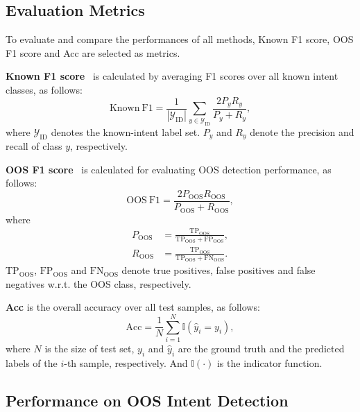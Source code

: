 \documentclass[11pt]{article}
\begin{document}
\subsection{Evaluation Metrics}

To evaluate and compare the performances of all methods, Known F1 score, OOS F1 score and Acc are selected as metrics. 

\textbf{Known F1 score}~\citep{wang2021texsmart, zawbaa2024improved} is calculated by averaging F1 scores over all known intent classes, as follows:
\begin{equation}
\mathrm{Known\ F1}=\frac{1}{|\mathcal{Y}_{\mathrm{ID}}|}\sum_{y \in \mathcal{Y}_{\mathrm{ID}}}\frac{2P_yR_y}{P_y+R_y},
\end{equation}
where $\mathcal{Y}_{\mathrm{ID}}$ denotes the known-intent label set. $P_y$ and $R_y$ denote the precision and recall of class $y$, respectively.

\textbf{OOS F1 score}~\citep{wang2021texsmart, zawbaa2024improved} is calculated for evaluating OOS detection performance, as follows:
\begin{equation}
\mathrm{OOS\ F1}=\frac{2 P_{\mathrm{OOS}} R_{\mathrm{OOS}}}{P_{\mathrm{OOS}} + R_{\mathrm{OOS}}},
\end{equation}
where
\begin{equation}
\begin{aligned}
P_{\mathrm{OOS}}&=\frac{\mathrm{TP}_{\mathrm{OOS}}} {\mathrm{TP}_{\mathrm{OOS}}+\mathrm{FP}_{\mathrm{OOS}}}, \\
R_{\mathrm{OOS}}&=\frac{\mathrm{TP}_{\mathrm{OOS}}}
{\mathrm{TP}_{\mathrm{OOS}}+\mathrm{FN}_{\mathrm{OOS}}}.
\end{aligned}
\end{equation}
$\mathrm{TP}_{\mathrm{OOS}}$, $\mathrm{FP}_{\mathrm{OOS}}$ and $\mathrm{FN}_{\mathrm{OOS}}$ denote true positives, false positives and false negatives w.r.t. the OOS class, respectively.

\textbf{Acc} is the overall accuracy over all test samples, as follows:
\begin{equation}
\mathrm{Acc}=\frac{1}{N}\sum_{i=1}^{N}\mathbb{I}(\hat{y}_i = y_i),
\end{equation}
where $N$ is the size of test set, $y_i$ and $\hat{y}_i$ are the ground truth and the predicted labels of the $i$-th sample, respectively. And $\mathbb{I}(\cdot)$ is the indicator function.

\subsection{Performance on OOS Intent Detection}
\end{document}
